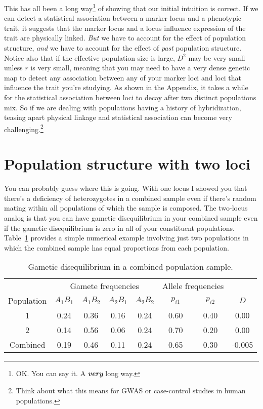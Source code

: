 \documentclass[12pt]{article}
\begin{document}
This has all been a long way\footnote{OK. You can say it. A {\bf\it
    very\/} long way.} of showing that our initial intuition is
correct. If we can detect a statistical association between a marker
locus and a phenotypic trait, it suggests that the marker locus and a
locus influence expression of the trait are physically linked. {\it
  But\/} we have to account for the effect of population structure,
{\it and\/} we have to account for the effect of {\it past\/}
population structure. Notice also that if the effective population
size is large, $D^2$ may be very small unless $r$ is very small,
meaning that you may need to have a very dense genetic map to detect
any association between any of your marker loci and loci that
influence the trait you're studying. As shown in the Appendix, it
takes a while for the statistical association between loci to decay
after two distinct populations mix. So if we are dealing with
populations having a history of hybridization, teasing apart physical
linkage and statistical association can become very
challenging.\footnote{Think about what this means for GWAS or
  case-control studies in human populations.}

\section*{Population structure with two loci}

You can probably guess where this is going. With one locus I showed
you that there's a deficiency of heterozygotes in a combined sample
even if there's random mating within all populations of which the
sample is composed. The two-locus analog is that you can have gametic
disequilibrium in your combined sample even if the gametic
disequilibrium is zero in all of your constituent
populations. Table~\ref{table:d-structure} provides a simple numerical
example involving just two populations in which the combined sample
has equal proportions from each population.

\begin{table}
\begin{center}
\begin{tabular}{c|cccc|cc|c}
\hline\hline
           & \multicolumn{4}{c|}{Gamete frequencies}
           & \multicolumn{2}{c|}{Allele frequencies} \\
Population & $A_1B_1$ & $A_1B_2$ & $A_2B_1$ & $A_2B_2$
           & $p_{i1}$ & $p_{i2}$ & $D$ \\
\hline
1          & 0.24     & 0.36     & 0.16    & 0.24
           & 0.60     & 0.40     & 0.00 \\
2          & 0.14     & 0.56     & 0.06    & 0.24
           & 0.70     & 0.20     & 0.00 \\
Combined   & 0.19     & 0.46     & 0.11    & 0.24
           & 0.65     & 0.30     & -0.005 \\
\hline
\end{tabular}
\end{center}
\caption{Gametic disequilibrium in a combined population
  sample.}\label{table:d-structure}
\end{table}
\end{document}
